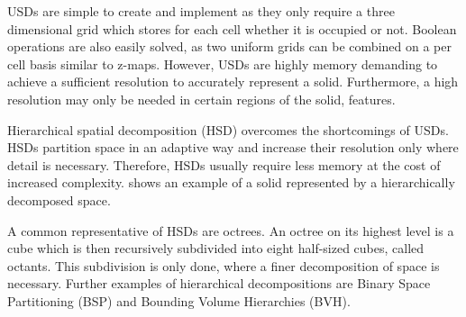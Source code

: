 \begin{description}
	USDs are simple to create and implement as they only require a three dimensional grid which stores for each cell whether it is occupied or not.
	Boolean operations are also easily solved, as two uniform grids can be combined on a per cell basis similar to z-maps.
	However, USDs are highly memory demanding to achieve a sufficient resolution to accurately represent a solid.
	Furthermore, a high resolution may only be needed in certain regions of the solid, \ie features.

	Hierarchical spatial decomposition (HSD) overcomes the shortcomings of USDs.
	HSDs partition space in an adaptive way and increase their resolution only where detail is necessary.
	Therefore, HSDs usually require less memory at the cost of increased complexity.
	 shows an example of a solid represented by a hierarchically decomposed space.

	A common representative of HSDs are octrees.
	An octree on its highest level is a cube which is then recursively subdivided into eight half-sized cubes, called octants.
	This subdivision is only done, where a finer decomposition of space is necessary.
	Further examples of hierarchical decompositions are Binary Space Partitioning (BSP) and Bounding Volume Hierarchies (BVH).


\end{description}

